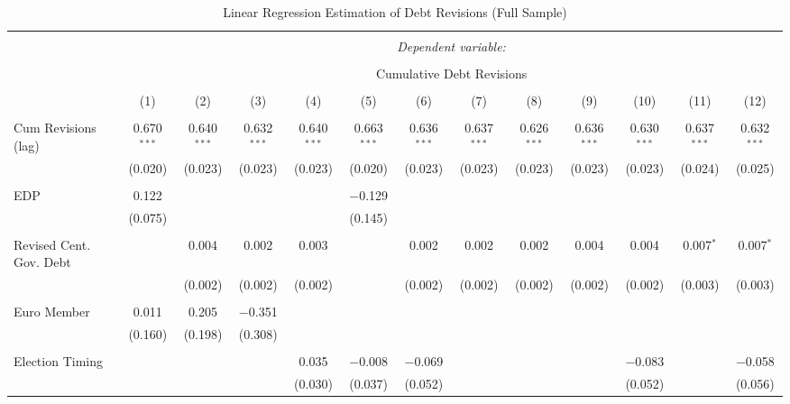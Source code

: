 
\begin{table}[!htbp] \centering 
  \caption{Linear Regression Estimation of Debt Revisions (Full Sample)} 
  \label{debt_results} 
\tiny 
\begin{tabular}{@{\extracolsep{5pt}}lcccccccccccc} 
\\[-1.8ex]\hline 
\hline \\[-1.8ex] 
 & \multicolumn{12}{c}{\textit{Dependent variable:}} \\ 
\cline{2-13} 
\\[-1.8ex] & \multicolumn{12}{c}{Cumulative Debt Revisions} \\ 
\\[-1.8ex] & (1) & (2) & (3) & (4) & (5) & (6) & (7) & (8) & (9) & (10) & (11) & (12)\\ 
\hline \\[-1.8ex] 
 Cum Revisions (lag) & 0.670$^{***}$ & 0.640$^{***}$ & 0.632$^{***}$ & 0.640$^{***}$ & 0.663$^{***}$ & 0.636$^{***}$ & 0.637$^{***}$ & 0.626$^{***}$ & 0.636$^{***}$ & 0.630$^{***}$ & 0.637$^{***}$ & 0.632$^{***}$ \\ 
  & (0.020) & (0.023) & (0.023) & (0.023) & (0.020) & (0.023) & (0.023) & (0.023) & (0.023) & (0.023) & (0.024) & (0.025) \\ 
  & & & & & & & & & & & & \\ 
 EDP & 0.122 &  &  &  & $-$0.129 &  &  &  &  &  &  &  \\ 
  & (0.075) &  &  &  & (0.145) &  &  &  &  &  &  &  \\ 
  & & & & & & & & & & & & \\ 
 Revised Cent. Gov. Debt &  & 0.004 & 0.002 & 0.003 &  & 0.002 & 0.002 & 0.002 & 0.004 & 0.004 & 0.007$^{*}$ & 0.007$^{*}$ \\ 
  &  & (0.002) & (0.002) & (0.002) &  & (0.002) & (0.002) & (0.002) & (0.002) & (0.002) & (0.003) & (0.003) \\ 
  & & & & & & & & & & & & \\ 
 Euro Member & 0.011 & 0.205 & $-$0.351 &  &  &  &  &  &  &  &  &  \\ 
  & (0.160) & (0.198) & (0.308) &  &  &  &  &  &  &  &  &  \\ 
  & & & & & & & & & & & & \\ 
 Election Timing &  &  &  & 0.035 & $-$0.008 & $-$0.069 &  &  &  & $-$0.083 &  & $-$0.058 \\ 
  &  &  &  & (0.030) & (0.037) & (0.052) &  &  &  & (0.052) &  & (0.056) \\ 

\end{tabular}
\end{table}
